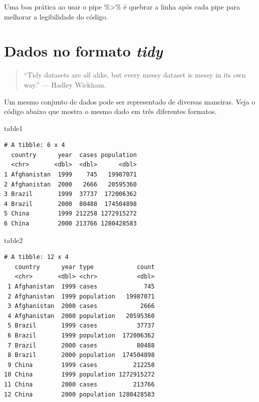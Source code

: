 \documentclass[
  portuguese,
  letterpaper,
  DIV=11,
  numbers=noendperiod]{scrreprt}
\newenvironment{Shaded}{\begin{snugshade}}{\end{snugshade}}
\newcommand{\NormalTok}[1]{\textcolor[rgb]{0.00,0.23,0.31}{#1}}
\theoremstyle{definition}
\theoremstyle{remark}
\begin{document}
\begin{tcolorbox}[enhanced jigsaw, leftrule=.75mm, opacitybacktitle=0.6, colback=white, coltitle=black, colframe=quarto-callout-tip-color-frame, titlerule=0mm, left=2mm, opacityback=0, breakable, bottomtitle=1mm, toprule=.15mm, title=\textcolor{quarto-callout-tip-color}{\faLightbulb}\hspace{0.5em}{Dica}, colbacktitle=quarto-callout-tip-color!10!white, arc=.35mm, rightrule=.15mm, bottomrule=.15mm, toptitle=1mm]

Uma boa prática ao usar o pipe \%\textgreater\% é quebrar a linha após
cada pipe para melhorar a legibilidade do código.

\end{tcolorbox}

\section{\texorpdfstring{Dados no formato
\emph{tidy}}{Dados no formato tidy}}\label{dados-no-formato-tidy}

\begin{quote}
``Tidy datasets are all alike, but every messy dataset is messy in its
own way.'' --- Hadley Wickham.
\end{quote}

Um mesmo conjunto de dados pode ser representado de diversas maneiras.
Veja o código abaixo que mostra o mesmo dado em três diferentes
formatos.

\begin{Shaded}
\begin{Highlighting}[]
\NormalTok{table1}
\end{Highlighting}
\end{Shaded}

\begin{verbatim}
# A tibble: 6 x 4
  country      year  cases population
  <chr>       <dbl>  <dbl>      <dbl>
1 Afghanistan  1999    745   19987071
2 Afghanistan  2000   2666   20595360
3 Brazil       1999  37737  172006362
4 Brazil       2000  80488  174504898
5 China        1999 212258 1272915272
6 China        2000 213766 1280428583
\end{verbatim}

\begin{Shaded}
\begin{Highlighting}[]
\NormalTok{table2}
\end{Highlighting}
\end{Shaded}

\begin{verbatim}
# A tibble: 12 x 4
   country      year type            count
   <chr>       <dbl> <chr>           <dbl>
 1 Afghanistan  1999 cases             745
 2 Afghanistan  1999 population   19987071
 3 Afghanistan  2000 cases            2666
 4 Afghanistan  2000 population   20595360
 5 Brazil       1999 cases           37737
 6 Brazil       1999 population  172006362
 7 Brazil       2000 cases           80488
 8 Brazil       2000 population  174504898
 9 China        1999 cases          212258
10 China        1999 population 1272915272
11 China        2000 cases          213766
12 China        2000 population 1280428583
\end{verbatim}
\end{document}
